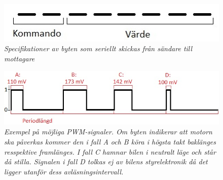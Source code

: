\documentclass[a4paper]{article}
\begin{document}
\begin{figure}[H]
\includegraphics[scale=1]{aByteComVal.jpg}
\centering
\caption{\it Specifikationer av byten som seriellt skickas från sändare till mottagare}
\end{figure} 


\begin{figure}[H]
\includegraphics[scale=1]{PWMsignals.jpg}
\centering
\caption{\it Exempel på möjliga PWM-signaler. Om byten indikerar att motorn ska påverkas kommer den i fall A och B köra i högsta takt baklänges resspektive framlänges. I fall C hamnar bilen i neutralt läge och står då stilla. Signalen i fall D tolkas ej av bilens styrelektronik då det ligger utanför dess avläsningsintervall.}
\end{figure} 







\end{document}
